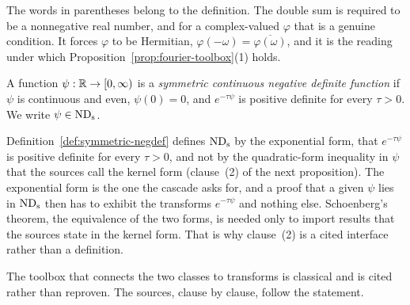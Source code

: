 The words in parentheses belong to the definition. The double sum is required to be a
nonnegative real number, and for a complex-valued $\varphi$ that is a genuine condition. It
forces $\varphi$ to be Hermitian, $\varphi(-\omega) = \overline{\varphi(\omega)}$, and it is
the reading under which Proposition~\ref{prop:fourier-toolbox}(1) holds.

\begin{definition}\label{def:symmetric-negdef}
A function $\psi : \mathbb{R} \to [0,\infty)$ is a \emph{symmetric continuous negative definite
function} if $\psi$ is continuous and even, $\psi(0) = 0$, and $e^{-\tau\psi}$ is positive
definite for every $\tau > 0$. We write $\psi \in \mathrm{ND}_{\mathrm{s}}$.
\end{definition}

Definition~\ref{def:symmetric-negdef} defines $\mathrm{ND}_{\mathrm{s}}$ by the exponential form, that
$e^{-\tau\psi}$ is positive definite for every $\tau > 0$, and not by the quadratic-form
inequality in $\psi$ that the sources call the kernel form (clause~(2) of the next
proposition). The exponential form is the one the cascade asks for, and a proof that a
given $\psi$ lies in $\mathrm{ND}_{\mathrm{s}}$ then has to exhibit the transforms $e^{-\tau\psi}$ and nothing
else. Schoenberg's theorem, the equivalence of the two forms, is needed only to import
results that the sources state in the kernel form. That is why clause~(2) is a cited
interface rather than a definition.

The toolbox that connects the two classes to transforms is classical and is cited rather
than reproven. The sources, clause by clause, follow the statement.

